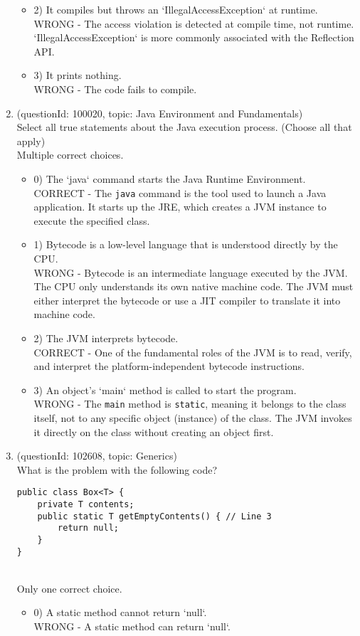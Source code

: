 \documentclass[12pt]{article}
\begin{document}
\begin{enumerate}[label=(\arabic*)]
\begin{itemize}
\item 2) It compiles but throws an `IllegalAccessException` at runtime.
 \\ 
WRONG - The access violation is detected at compile time, not runtime. `IllegalAccessException` is more commonly associated with the Reflection API.

\item 3) It prints nothing.
 \\ 
WRONG - The code fails to compile.

\end{itemize}
\item (questionId: 100020, topic: Java Environment and Fundamentals) \\ 
Select all true statements about the Java execution process. (Choose all that apply)
\\ \noindent Multiple correct choices. 
\begin{itemize}
\item 0) The `java` command starts the Java Runtime Environment.
 \\ 
CORRECT - The \verb|java| command is the tool used to launch a Java application. It starts up the JRE, which creates a JVM instance to execute the specified class.

\item 1) Bytecode is a low-level language that is understood directly by the CPU.
 \\ 
WRONG - Bytecode is an intermediate language executed by the JVM. The CPU only understands its own native machine code. The JVM must either interpret the bytecode or use a JIT compiler to translate it into machine code.

\item 2) The JVM interprets bytecode.
 \\ 
CORRECT - One of the fundamental roles of the JVM is to read, verify, and interpret the platform-independent bytecode instructions.

\item 3) An object's `main` method is called to start the program.
 \\ 
WRONG - The \verb|main| method is \verb|static|, meaning it belongs to the class itself, not to any specific object (instance) of the class. The JVM invokes it directly on the class without creating an object first.

\end{itemize}
\item (questionId: 102608, topic: Generics) \\ 
What is the problem with the following code?\begin{verbatim}
public class Box<T> {
    private T contents;
    public static T getEmptyContents() { // Line 3
        return null;
    }
}
\end{verbatim}
\\ \noindent Only one correct choice. 
\begin{itemize}
\item 0) A static method cannot return `null`.
 \\ 
WRONG - A static method can return `null`.


\end{itemize}
\end{enumerate}
\end{document}
